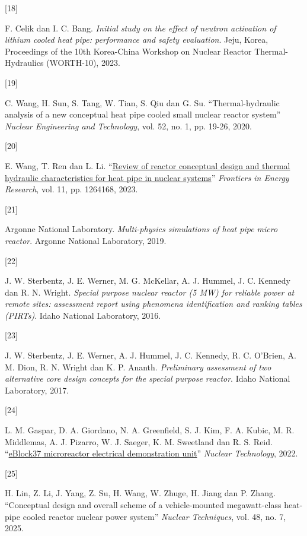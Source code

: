 \documentclass[
  indonesian,
  12pt,
  a4paper,
]{report}
\newlength{\cslhangindent}
\newlength{\csllabelwidth}
\newenvironment{CSLReferences}[2] %
 {\begin{list}{}{%
  \setlength{\itemindent}{0pt}
  \setlength{\leftmargin}{0pt}
  \setlength{\parsep}{0pt}
  \ifodd #1
   \setlength{\leftmargin}{\cslhangindent}
   \setlength{\itemindent}{-1\cslhangindent}
  \fi
  \setlength{\itemsep}{#2\baselineskip}}}
 {\end{list}}
\newcommand{\CSLLeftMargin}[1]{\parbox[t]{\csllabelwidth}{\strut#1\strut}}
\newcommand{\CSLRightInline}[1]{\parbox[t]{\linewidth - \csllabelwidth}{\strut#1\strut}}
\begin{document}
\begin{CSLReferences}{0}{1}
\CSLLeftMargin{{[}18{]} }%
\CSLRightInline{F. Celik dan I. C. Bang. \emph{Initial study on the
effect of neutron activation of lithium cooled heat pipe: performance
and safety evaluation}. Jeju, Korea, Proceedings of the 10th Korea-China
Workshop on Nuclear Reactor Thermal-Hydraulics (WORTH-10), 2023.}

\CSLLeftMargin{{[}19{]} }%
\CSLRightInline{C. Wang, H. Sun, S. Tang, W. Tian, S. Qiu dan G. Su.
{``Thermal-hydraulic analysis of a new conceptual heat pipe cooled small
nuclear reactor system''} \emph{Nuclear Engineering and Technology},
vol. 52, no. 1, pp. 19-26, 2020.}

\CSLLeftMargin{{[}20{]} }%
\CSLRightInline{E. Wang, T. Ren dan L. Li.
{``\href{https://doi.org/10.3389/fenrg.2023.1264168}{Review of reactor
conceptual design and thermal hydraulic characteristics for heat pipe in
nuclear systems}''} \emph{Frontiers in Energy Research}, vol. 11, pp.
1264168, 2023.}

\CSLLeftMargin{{[}21{]} }%
\CSLRightInline{Argonne National Laboratory. \emph{Multi-physics
simulations of heat pipe micro reactor}. Argonne National Laboratory,
2019.}

\CSLLeftMargin{{[}22{]} }%
\CSLRightInline{J. W. Sterbentz, J. E. Werner, M. G. McKellar, A. J.
Hummel, J. C. Kennedy dan R. N. Wright. \emph{Special purpose nuclear
reactor (5 {MW}) for reliable power at remote sites: assessment report
using phenomena identification and ranking tables ({PIRTs})}. Idaho
National Laboratory, 2016.}

\CSLLeftMargin{{[}23{]} }%
\CSLRightInline{J. W. Sterbentz, J. E. Werner, A. J. Hummel, J. C.
Kennedy, R. C. O'Brien, A. M. Dion, R. N. Wright dan K. P. Ananth.
\emph{Preliminary assessment of two alternative core design concepts for
the special purpose reactor}. Idaho National Laboratory, 2017.}

\CSLLeftMargin{{[}24{]} }%
\CSLRightInline{L. M. Gaspar, D. A. Giordano, N. A. Greenfield, S. J.
Kim, F. A. Kubic, M. R. Middlemas, A. J. Pizarro, W. J. Saeger, K. M.
Sweetland dan R. S. Reid.
{``\href{https://doi.org/10.1080/00295450.2021.1997540}{{eBlock37}
microreactor electrical demonstration unit}''} \emph{Nuclear
Technology}, 2022.}

\CSLLeftMargin{{[}25{]} }%
\CSLRightInline{H. Lin, Z. Li, J. Yang, Z. Su, H. Wang, W. Zhuge, H.
Jiang dan P. Zhang. {``Conceptual design and overall scheme of a
vehicle-mounted megawatt-class heat-pipe cooled reactor nuclear power
system''} \emph{Nuclear Techniques}, vol. 48, no. 7, 2025.}


\end{CSLReferences}
\end{document}
